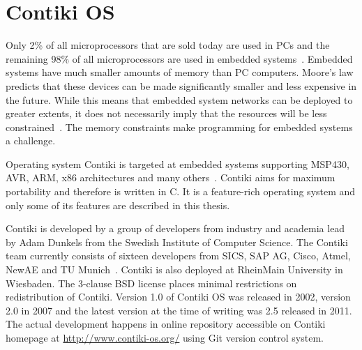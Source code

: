 
\chapter{Contiki OS}
Only 2\% of all microprocessors that are sold today are used in PCs and the remaining 98\%
of all microprocessors are used in embedded systems~\cite{thesis-programming}.
Embedded systems have much smaller amounts of memory than PC computers.
Moore's law predicts that these devices
can be made significantly smaller and less expensive in the future.
While this means that embedded system networks can
be deployed to greater extents, it does not necessarily imply
that the resources will be less constrained~\cite{paper-contiki}.
The memory constraints make programming for embedded systems a challenge.

Operating system Contiki is targeted at embedded systems supporting MSP430, AVR, ARM, x86
architectures and many others~\cite{contiki-docs}.
Contiki aims for maximum portability and therefore is written in C.
It is a feature-rich operating system and
only some of its features are described in this thesis.

Contiki is developed by a group of developers from industry and academia
lead by Adam Dunkels from the Swedish Institute of Computer Science.
The Contiki team currently consists of sixteen developers from SICS,
SAP AG, Cisco, Atmel, NewAE and TU Munich~\cite{contiki-docs}.
Contiki is also deployed at RheinMain University in Wiesbaden.
The 3-clause BSD license places minimal restrictions on redistribution of Contiki.
Version 1.0 of Contiki OS was released in 2002, version 2.0 in 2007 and the latest version
at the time of writing was 2.5 released in 2011.
The actual development happens in online repository accessible on Contiki homepage at \url{http://www.contiki-os.org/}
using Git version control system.










